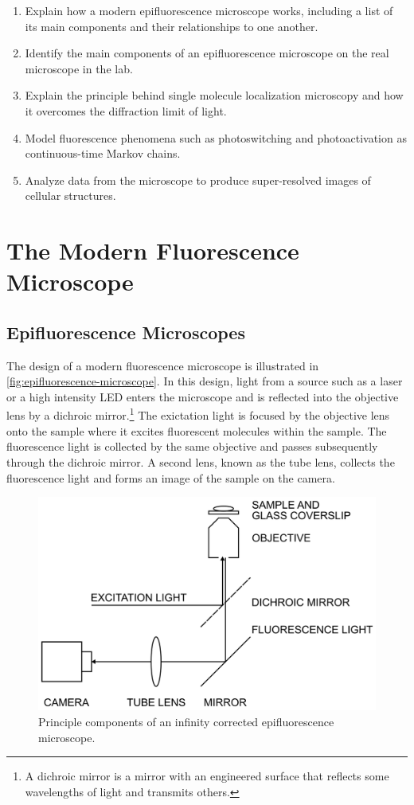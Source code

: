 \documentclass[10pt,a4paper]{book}
\begin{document}
\begin{enumerate}
    \item Explain how a modern epifluorescence microscope works, including a list of its main components and their relationships to one another.
    \item Identify the main components of an epifluorescence microscope on the real microscope in the lab.
    \item Explain the principle behind single molecule localization microscopy and how it overcomes the diffraction limit of light.
    \item Model fluorescence phenomena such as photoswitching and photoactivation as continuous-time Markov chains.
    \item Analyze data from the microscope to produce super-resolved images of cellular structures.
\end{enumerate}

\chapter{The Modern Fluorescence Microscope}

\section{Epifluorescence Microscopes}

The design of a modern fluorescence microscope is illustrated in \autoref{fig:epifluorescence-microscope}. In this design, light from a source such as a laser or a high intensity LED enters the microscope and is reflected into the objective lens by a dichroic mirror.\footnote{A dichroic mirror is a mirror with an engineered surface that reflects some wavelengths of light and transmits others.} The exictation light is focused by the objective lens onto the sample where it excites fluorescent molecules within the sample. The fluorescence light is collected by the same objective and passes subsequently through the dichroic mirror. A second lens, known as the tube lens, collects the fluorescence light and forms an image of the sample on the camera.

\begin{figure}[ht]
    \centering
    \includegraphics{epifluorescence-microscope.png}
    \caption{Principle components of an infinity corrected epifluorescence microscope.}
    \label{fig:epifluorescence-microscope}
\end{figure}
\end{document}
